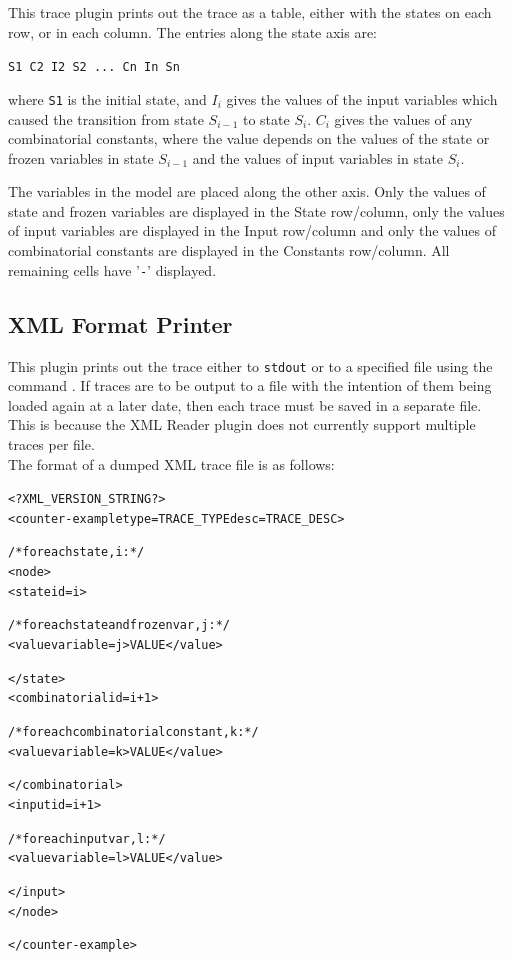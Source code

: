 This trace plugin prints out the trace as a table, either with the
states on each row, or in each column. The entries along the state
axis are:

\begin{center}
\texttt{S1 C2 I2 S2 ...~Cn In Sn}
\end{center}

where \texttt{S1} is the initial state, and \texttt{$I_i$} gives the
values of the input variables which caused the transition from state
\texttt{$S_{i-1}$} to state \texttt{$S_i$}. \texttt{$C_i$} gives the
values of any combinatorial constants, where the value depends on the
values of the state or frozen variables in state \texttt{$S_{i-1}$} and the
values of input variables in state \texttt{$S_i$}.

The variables in the model are placed along the other axis. Only the
values of state and frozen variables are displayed in the 
State row/column, only
the values of input variables are displayed in the Input row/column
and only the values of combinatorial constants are displayed in the
Constants row/column. All remaining cells have '\texttt{-}' displayed.


\subsection{XML Format Printer}
\label{XML Format Printer}

This plugin prints out the trace either to \texttt{stdout} or to a
specified file using the command .  If traces
are to be output to a file with the intention of them being loaded
again at a later date, then each trace must be saved in a separate
file. This is because the XML Reader plugin does not currently support
multiple traces per file.\\The format of a dumped XML trace file is as
follows:

\begin{alltt}
<?XML_VERSION_STRING?>
<counter-example type=TRACE_TYPE desc=TRACE_DESC>

  /* for each state, i: */
  <node>
    <state id=i>

      /* for each state and frozen var, j: */
      <value variable=j>VALUE</value>

    </state>
    <combinatorial id=i+1>

      /* for each combinatorial constant, k: */
      <value variable=k>VALUE</value>

    </combinatorial>
    <input id=i+1>

      /* for each input var, l: */
      <value variable=l>VALUE</value>

    </input>
  </node>

</counter-example>
\end{alltt}

